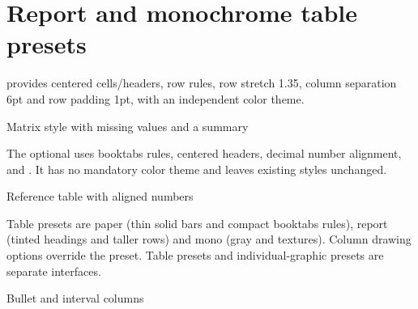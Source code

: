 \section{Report and monochrome table presets}
 provides centered cells/headers, row rules, row stretch 1.35,
column separation 6pt and row padding 1pt, with an independent color theme.
\begin{demo}{Matrix style with missing values and a summary}
\begin{center}
\begin{gradtable}[align=c,header align=c,style=matrix,theme=teal,width=\linewidth]
\end{gradtable}
\end{center}
\end{demo}
The optional  uses booktabs rules, centered headers,
decimal number alignment,  and .
It has no mandatory color theme and leaves existing styles unchanged.
\begin{demo}{Reference table with aligned numbers}
\begin{center}
\begin{gradtable}[align=c,header align=c,style=reference,theme=teal,width=\linewidth]
\end{gradtable}
\end{center}
\end{demo}
Table presets are paper (thin solid bars and compact booktabs rules), report
(tinted headings and taller rows) and mono (gray and textures). Column drawing
options override the preset. Table presets and individual-graphic presets are
separate interfaces.
\begin{demo}{Bullet and interval columns}
\begin{center}
\begin{gradtable}[align=c,header align=c,preset=report,graphic width=32mm,
  text width=19mm,label width=19mm]
\end{gradtable}
\end{center}
\end{demo}
